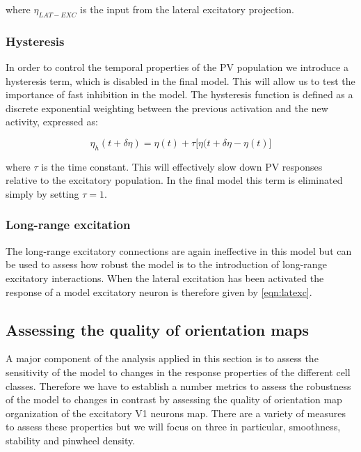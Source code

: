 where $\eta_{LAT-EXC}$ is the input from the lateral excitatory
projection.

\subsubsection{Hysteresis}

In order to control the temporal properties of the PV population we
introduce a hysteresis term, which is disabled in the final
model. This will allow us to test the importance of fast inhibition in
the model. The hysteresis function is defined as a discrete
exponential weighting between the previous activation and the new
activity, expressed as:

\begin{equation}
  \eta_h (t + \delta\eta) = \eta(t) + \tau \big[ \eta(t+\delta\eta - \eta(t) \big]
\end{equation}

where $\tau$ is the time constant. This will effectively slow down PV
responses relative to the excitatory population. In the final model
this term is eliminated simply by setting $\tau = 1$.

\subsubsection{Long-range excitation}

The long-range excitatory connections are again ineffective in this
model but can be used to assess how robust the model is to the
introduction of long-range excitatory interactions. When the lateral
excitation has been activated the response of a model excitatory
neuron is therefore given by \ref{eqn:latexc}.

\subsection{Assessing the quality of orientation maps} \label{metrics}

A major component of the analysis applied in this section is to assess
the sensitivity of the model to changes in the response properties of
the different cell classes. Therefore we have to establish a number
metrics to assess the robustness of the model to changes in contrast
by assessing the quality of orientation map organization of the
excitatory V1 neurons map. There are a variety of measures to assess
these properties but we will focus on three in particular, smoothness,
stability and pinwheel density.

